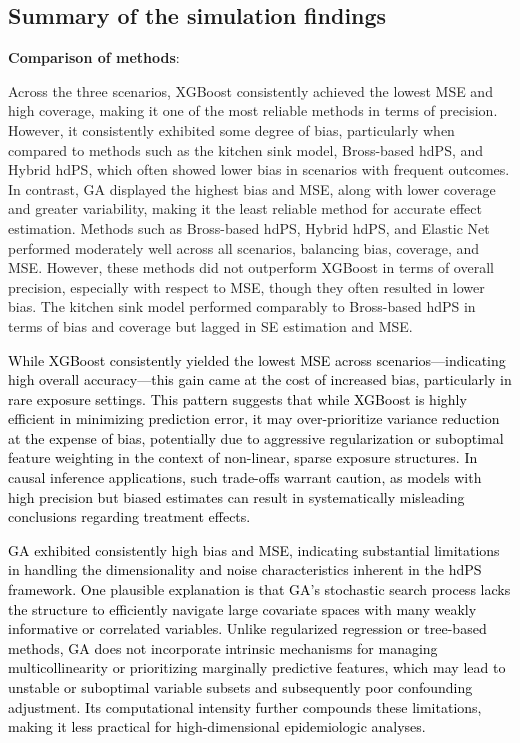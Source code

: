 \documentclass[10pt,letterpaper]{article}
\begin{document}
\subsection{Summary of the simulation
findings}\label{summary-of-the-simulation-findings}

\textbf{Comparison of methods}:

Across the three scenarios, XGBoost consistently achieved the lowest MSE
and high coverage, making it one of the most reliable methods in terms
of precision. However, it consistently exhibited some degree of bias,
particularly when compared to methods such as the kitchen sink model,
Bross-based hdPS, and Hybrid hdPS, which often showed lower bias in
scenarios with frequent outcomes. In contrast, GA displayed the highest
bias and MSE, along with lower coverage and greater variability, making
it the least reliable method for accurate effect estimation. Methods
such as Bross-based hdPS, Hybrid hdPS, and Elastic Net performed
moderately well across all scenarios, balancing bias, coverage, and MSE.
However, these methods did not outperform XGBoost in terms of overall
precision, especially with respect to MSE, though they often resulted in
lower bias. The kitchen sink model performed comparably to Bross-based
hdPS in terms of bias and coverage but lagged in SE estimation and MSE.

\textcolor{black}{While XGBoost consistently yielded the lowest MSE across scenarios—indicating high overall accuracy—this gain came at the cost of increased bias, particularly in rare exposure settings. This pattern suggests that while XGBoost is highly efficient in minimizing prediction error, it may over-prioritize variance reduction at the expense of bias, potentially due to aggressive regularization or suboptimal feature weighting in the context of non-linear, sparse exposure structures. In causal inference applications, such trade-offs warrant caution, as models with high precision but biased estimates can result in systematically misleading conclusions regarding treatment effects.}

\textcolor{black}{GA exhibited consistently high bias and MSE, indicating substantial limitations in handling the dimensionality and noise characteristics inherent in the hdPS framework. One plausible explanation is that GA’s stochastic search process lacks the structure to efficiently navigate large covariate spaces with many weakly informative or correlated variables. Unlike regularized regression or tree-based methods, GA does not incorporate intrinsic mechanisms for managing multicollinearity or prioritizing marginally predictive features, which may lead to unstable or suboptimal variable subsets and subsequently poor confounding adjustment. Its computational intensity further compounds these limitations, making it less practical for high-dimensional epidemiologic analyses.}
\end{document}
